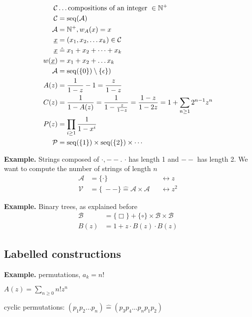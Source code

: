 \begin{align*}
    \mathcal{C} &\ldots \text{compositions of an integer }\in \mathbb{N}^{+} \\
    \mathcal{C} &= \operatorname{seq}(\mathcal{A}) \\
     \mathcal{A} &= \mathbb{N}^{+}, w_A(x) = x\\
	\underline{x} &= (x_1, x_2, \ldots x_k) \in \mathcal{C}\\
    \underline{x} &\mathrel{\hat{=}} x_1 + x_2 + \cdots + x_k\\
    w(\underline{x}) &= x_1 + x_2 + \ldots x_k\\
    \mathcal{A}&=\operatorname{seq}( \{ 0 \})\setminus \{\epsilon\}) \\
    A(z) &= \frac{1}{1-z} - 1 = \frac{z}{1-z} \\
    C(z) &= \frac{1}{1-A(z)} = \frac{1}{1-\frac{z}{1-z} }
         = \frac{1-z}{1-2z} 
         = 1 + \sum_{n\geq 1} 2^{n-1} z^n \\
    P(z) &= \prod_{i\geq 1} \frac{1}{1-x^i}\\
	\mathcal{P} &= \operatorname{seq}(\{1\}) \times \operatorname{seq}(\{2\}) \times \cdots \\
\end{align*}	 

\textbf{Example.}
Strings composed of $\cdot, --$. 
$\cdot$ has length 1 and $--$ has length 2.
We want to compute the number of strings of length $n$
\begin{align*}
  \mathcal{A} &= \{\cdot\} && \leftrightarrow z\\
  \mathcal{V} &= \{\ -- \} \mathrel{\hat{=}} \mathcal{A} \times \mathcal{A} && \leftrightarrow z^2 
\end{align*}

\textbf{Example.}
Binary trees, as explained before
\begin{align*}
  \mathcal{B} &= \{ \Box\} + \{ \circ\} \times \mathcal{B} \times \mathcal{B}\\
  B(z) &= 1 + z \cdot B(z) \cdot B(z)
\end{align*}

\subsection{Labelled constructions}
\textbf{Example.}
permutations, $a_k = n!$

$A(z) = \sum_{n\geq 0} n! z^n$

cyclic permutations: $(p_1 p_2 \ldots p_n) \mathrel{\hat{=}} (p_3 p_4 \ldots p_n p_1 p_2)$

